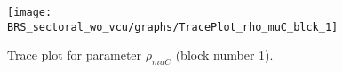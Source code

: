 \begin{figure}[H]
\centering
  \texttt{[image: BRS\_sectoral\_wo\_vcu/graphs/TracePlot\_rho\_muC\_blck\_1]}\\
    \caption{Trace plot for parameter ${\rho_{muC}}$ (block number 1).}
\end{figure}
